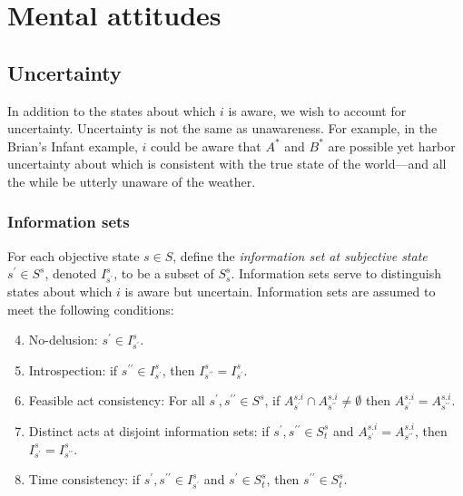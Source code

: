 \documentclass[
11pt,
titlepage,
reqno,
]{article}%
\theoremstyle{definition}
\begin{document}
	
\section{Mental attitudes}
	
\subsection{Uncertainty}
	
In addition to the states about which $i$ is aware, we wish to account for uncertainty. 
Uncertainty is not the same as unawareness.
For example, in the Brian's Infant example, $i$ could be aware that $A^\ast$ and $B^\ast$ are possible yet harbor uncertainty about which is consistent with the true state of the world---and all the while be utterly unaware of the weather.

\subsubsection{Information sets}
For each objective state $s\in S$, define the\textit{ information set at subjective state} $s^\prime\in S^s$, denoted $I^s_{s^\prime}$,  to be a subset of $S^s_s$.  
Information sets serve to distinguish states about which $i$ is aware but uncertain. 
Information sets are assumed to meet the following conditions:	
\begin{enumerate}
	\setcounter{enumi}{3}
	\item No-delusion: $s^\prime\in I^s_{s^\prime}$.
	\item Introspection: if $s^{\prime\prime}\in I^s_{s^\prime}$, then $I^s_{s^{\prime\prime}}=I^s_{s^\prime}$.
	\item Feasible act consistency: For all $s^\prime,s^{\prime\prime}\in S^s$, if $A^{s.i}_{s^\prime}\cap A^{s.i}_{s^{\prime\prime}}\ne \emptyset$ then $A^{s.i}_{s^\prime}= A^{s.i}_{s^{\prime\prime}}$.
	\item Distinct acts at disjoint information sets: if $s^\prime,s^{\prime\prime}\in S^s_t$ and $A^{s.i}_{s^\prime}= A^{s.i}_{s^{\prime\prime}}$, then $I^s_{s^\prime}=I^s_{s^{\prime\prime}}$.
	\item Time consistency: if $s^\prime,s^{\prime\prime}\in I^s_{s^\prime}$ and $s^\prime\in S^s_t$, then $s^{\prime\prime}\in S^s_t$.
\end{enumerate}
\end{document}
